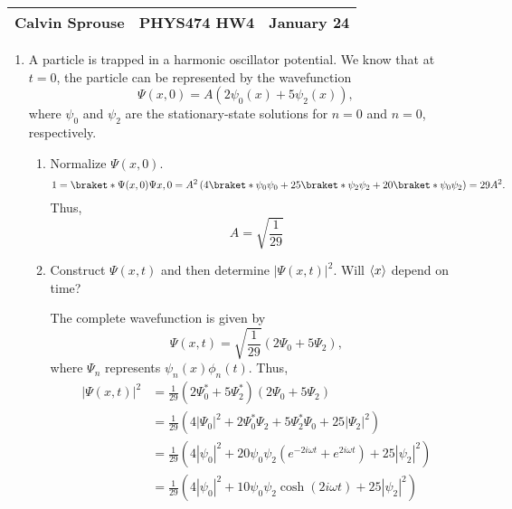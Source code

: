 \documentclass[a4paper, 12pt]{config/homework}
\begin{document}
\noindent
\begin{tabularx}{\textwidth}{>{\centering\arraybackslash}X>{\centering\arraybackslash}X>{\centering\arraybackslash}X}
Calvin Sprouse & PHYS474 HW4 & 2024 January 24\\
\midrule
\end{tabularx}

\begin{enumerate}
\item A particle is trapped in a harmonic oscillator potential. We know that at \(t=0\), the particle can be represented by the wavefunction
\[\Psi(x,0) = A\left(2\psi_0(x) + 5\psi_2(x)\right),\]
where \(\psi_0\) and \(\psi_2\) are the stationary-state solutions for \(n=0\) and \(n=0\), respectively.
\begin{enumerate}[label=(\alph*)]
\item Normalize \(\Psi(x,0)\).
\[1 = \braket*{\Psi(x,0)}{\Psi{x,0}}
= A^2 \left( 4 \braket*{\psi_0}{\psi_0} + 25 \braket*{\psi_2}{\psi_2} + 20\braket*{\psi_0}{\psi_2} \right)
= 29 A^2.\]
Thus,
\[A = \sqrt{\frac{1}{29}}\]

\item Construct \(\Psi(x,t)\) and then determine \(\left|\Psi(x,t)\right|^2\). Will \(\left\langle x \right\rangle\) depend on time?

The complete wavefunction is given by
\[\Psi(x,t) = \sqrt{\frac{1}{29}} \left( 2 \Psi_0 + 5 \Psi_2 \right),\]
where \(\Psi_n\) represents \(\psi_n(x)\phi_n(t)\). Thus,
\begin{align*}
\left| \Psi(x,t) \right|^2 &= \frac{1}{29}\left(2\Psi_0^* + 5\Psi_2^*\right)\left(2\Psi_0 + 5\Psi_2\right)
\\&= \frac{1}{29}\left(4\left|\Psi_0\right|^2 + 2\Psi_0^*\Psi_2 + 5\Psi_2^*\Psi_0 + 25\left|\Psi_2\right|^2\right)
\\&= \frac{1}{29}\left(4\left|\psi_0\right|^2
+ 20\psi_0\psi_2\left(e^{-2i\omega t} + e^{2i\omega t}\right)
+ 25\left|\psi_2\right|^2\right)
\\&= \frac{1}{29}\left(
4\left|\psi_0\right|^2
+ 10 \psi_0 \psi_2 \cosh(2i\omega t)
+ 25 \left|\psi_2\right|^2
\right)
\end{align*}


\end{enumerate}
\end{enumerate}
\end{document}
